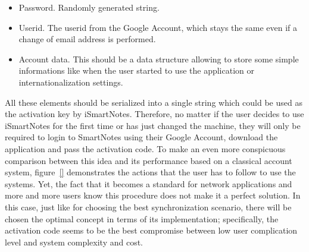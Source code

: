 \begin{itemize}
\item{Password. Randomly generated string.}
\item{Userid. The userid from the Google Account, which stays the same even if a change of email address is performed.}
\item{Account data. This should be a data structure allowing to store some simple informations like when the user started to use the application or internationalization settings.}
\end{itemize}
All these elements should be serialized into a single string which could be used as the activation key by iSmartNotes. Therefore, no matter if the user decides to use iSmartNotes for the first time or has just changed the machine, they will only be required to login to SmartNotes using their Google Account, download the application and pass the activation code. To make an even more conspicuous comparison between this idea and its performance based on a classical account system, figure~\ref{} demonstrates the actions that the user has to follow to use the systems. Yet, the fact that it becomes a standard for network applications and more and more users know this procedure does not make it a perfect solution. In this case, just like for choosing the best synchronization scenario, there will be chosen the optimal concept in terms of its implementation; specifically, the activation code seems to be the best compromise between low user complication level and system complexity and cost.
